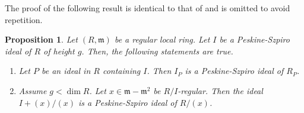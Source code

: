 \documentclass[12pt,reqno]{amsart}
\newtheorem{proposition}[theorem]{Proposition}
\theoremstyle{definition}
\newcommand{\m}{\mathfrak{m}}
\begin{document}
    The proof of the following result is identical to that of \cite[Proposition 2.1]{Put24} and is omitted to avoid repetition.
\begin{proposition}\label{localization and quotient is PS}
    Let $(R,\m)$ be a regular local ring. Let $I$ be a Peskine-Szpiro ideal of $R$ of height $g$. Then, the following statements are true.
    \begin{enumerate}[label=(\alph*), font=\upshape]
        \item Let $P$ be an ideal in $R$ containing $I$. Then $I_P$ is a Peskine-Szpiro ideal of $R_P$.
        \item Assume $g<\dim R$. Let $x\in \m-\m^2$ be $R/I$-regular. Then the ideal $I+(x)/(x)$ is a Peskine-Szpiro ideal of $R/(x)$.
    \end{enumerate}
\end{proposition}
\end{document}
